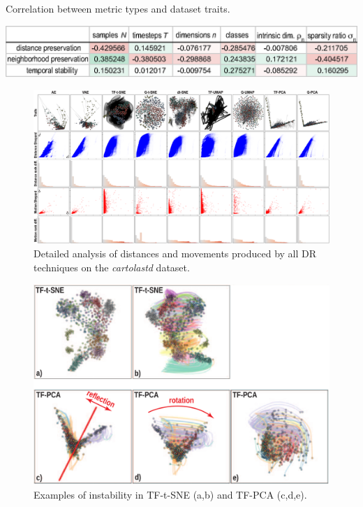 \begin{table}[h]
\centering
\caption{Correlation between metric types and dataset traits.}
\label{tab:corr_table}
\includegraphics[width=1.01\linewidth]{figures/projection-evaluation/corr_table.eps}
\end{table}

\begin{figure}
\hspace*{-0.02\linewidth}
  \includegraphics[width=1.0\linewidth]{figures/projection-evaluation/detailed_cartolastd.pdf}
  \caption{Detailed analysis of distances and movements produced by all DR techniques on the \emph{cartolastd} dataset.}
  \vspace{-0.15cm}
  \label{fig:trails_cartolastd}
\end{figure}


\begin{figure}[h]\centering
  \includegraphics[width=\linewidth]{figures/projection-evaluation/instability-a.png}
  \caption{Examples of instability in TF-t-SNE (a,b) and TF-PCA (c,d,e).}
  \vspace{-0.15cm}
  \label{fig:instability}
\end{figure}


